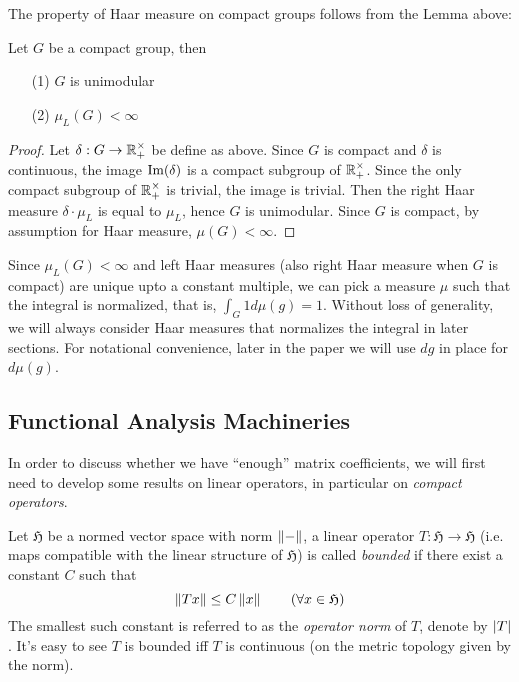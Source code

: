 The property of Haar measure on compact groups follows from the Lemma above:

\begin{lem}
  Let $G$ be a compact group, then
  \begin{enumerate}
    \item[(1)] $G$ is unimodular
    \item[(2)] $\mu_L(G) < \infty$
  \end{enumerate}
\end{lem}

\begin{proof}
  Let $\delta : G \to \operatorname{\mathbb{R}}_+^{\times}$ be define as above.  Since $G$ is compact
  and $\delta$ is continuous, the image $\operatorname{Im}(\delta)$ is a compact subgroup of
  $\operatorname{\mathbb{R}}_+^{\times}$.  Since the only compact subgroup of $\operatorname{\mathbb{R}}_+^{\times}$ is
  trivial, the image is trivial.  Then the right Haar measure $\delta \cdot
  \mu_L$ is equal to $\mu_L$, hence $G$ is unimodular.  Since $G$ is compact, by
  assumption for Haar measure, $\mu(G) < \infty$.
\end{proof}

Since $\mu_L(G) < \infty$ and left Haar measures (also right Haar measure when
$G$ is compact) are unique upto a constant multiple, we can pick a measure $\mu$
such that the integral is normalized, that is, $\int_G 1 d\mu(g) = 1$. Without
loss of generality, we will always consider Haar measures that normalizes the
integral in later sections. For notational convenience, later in the paper we
will use $dg$ in place for $d\mu(g)$.

\subsection{Functional Analysis Machineries}

In order to discuss whether we have ``enough'' matrix coefficients, we will
first need to develop some results on linear operators, in particular
on \emph{compact operators}.

Let $\mathfrak{H}$ be a normed vector space with norm $\left\lVert-\right\rVert$, a linear
operator $T : \mathfrak{H} \to \mathfrak{H}$ (i.e. maps compatible with the
linear structure of $\mathfrak{H}$) is called \emph{bounded} if there exist a
constant $C$ such that
\[
  \left\lVert Tx\right\rVert \leq C\left\lVert x\right\rVert \qquad (\forall x \in \mathfrak{H})
\]
The smallest such constant is referred to as the \emph{operator norm} of $T$,
denote by $\left|T\right|$.  It's easy to see $T$ is bounded iff $T$ is continuous (on
the metric topology given by the norm).

